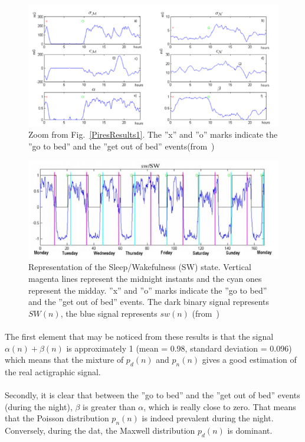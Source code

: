 \documentclass[a4paper,12pt]{article}
\begin{document}
\begin{figure}[H]
\centering
\includegraphics[scale=0.5]{Images/PiresResults2.png}
\caption{Zoom from Fig.~\ref{PiresResults1}. The ''x'' and ''o'' marks indicate the ''go to bed'' and the ''get out of bed'' events(from~\cite{Pires2009})}
\label{PiresResults2}
\end{figure}

\begin{figure}[H]
\centering
\includegraphics[scale=0.5]{Images/PiresResults3.png}
\caption{Representation of the Sleep/Wakefulness (SW) state. Vertical magenta lines represent the midnight instants and the cyan ones represent the midday. ''x'' and ''o'' marks indicate the ''go to bed'' and the ''get out of bed'' events. The dark binary signal represents $SW(n)$, the blue signal represents $sw(n)$ (from~\cite{Pires2009})}
\end{figure}

\paragraph{}
The first element that may be noticed from these results is that the signal $\alpha(n) + \beta(n)$ is approximately 1 (mean = 0.98, standard deviation = 0.096) which means that the mixture of $p_d(n)$ and $p_n(n)$ gives a good estimation of the real actigraphic signal.

\paragraph{}
Secondly, it is clear that between the ''go to bed'' and the ''get out of bed'' events (during the night), $\beta$ is greater than $\alpha$, which is really close to zero. That means that the Poisson distribution $p_n(n)$ is indeed prevalent during the night. Conversely, during the dat, the Maxwell distribution $p_d(n)$ is dominant.
\end{document}
